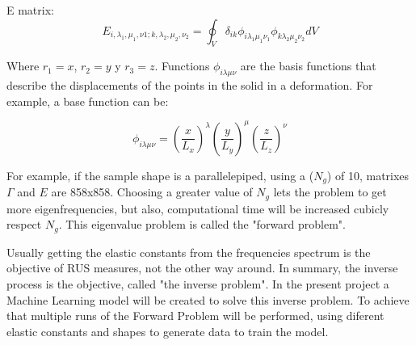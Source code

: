 \documentclass[12pt]{article}
\begin{document}
E matrix:
\begin{equation}
    E_{i, \lambda_1, \mu_1,  \nu1; k, \lambda_2, \mu_2, \nu_2} = \oint_{V}{\delta_{ik} \phi_{i \lambda_1 \mu_1 \nu_1}  \phi_{k \lambda_2 \mu_2 \nu_2} dV}
\end{equation}

Where $r_1 = x$, $r_2 = y$ y  $r_3 = z$. Functions $\phi_{i \lambda \mu \nu}$ are the basis functions that describe the displacements of the points in the solid in a deformation. For example, a base function can be: 

\begin{equation}
    \phi_{i \lambda \mu \nu} = \left(\frac{x}{L_x} \right)^{\lambda} \left(\frac{y}{L_y} \right)^{\mu} \left(\frac{z}{L_z} \right)^{\nu}
\end{equation}

For example, if the sample shape is a parallelepiped, using a ($N_g$) of 10, matrixes $\Gamma$ and $E$ are 858x858. Choosing a greater value of $N_g$ lets the problem to get more eigenfrequencies, but also, computational time will be increased cubicly respect $N_g$. This eigenvalue problem is called the "forward problem".

Usually getting the elastic constants from the frequencies spectrum is the objective of RUS measures, not the other way around. In summary, the inverse process is the objective, called "the inverse problem". In the present project a Machine Learning model will be created to solve this inverse problem. To achieve that multiple runs of the Forward Problem will be performed, using diferent elastic constants and shapes to generate data to train the model.









\vspace{1.5cm}
\end{document}
